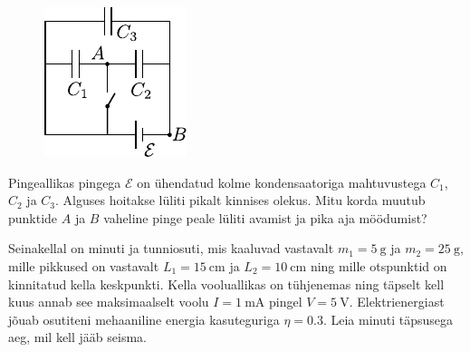 \documentclass[10pt]{article}
\begin{document}

\begin{figure}
		\vspace{-5pt}
		\includegraphics[width=\linewidth]{2020-lahg-06-yl.pdf}
	\end{figure}
	Pingeallikas pingega $\mathcal E$ on ühendatud kolme kondensaatoriga mahtuvustega $C_1$, $C_2$ ja $C_3$. Alguses hoitakse lüliti pikalt kinnises olekus. Mitu korda muutub punktide $A$ ja $B$ vaheline pinge peale lüliti avamist ja pika aja möödumist?
\probend
\bigskip

\setAuthor{}

Seinakellal on minuti ja tunniosuti, mis kaaluvad vastavalt
$m_1=\SI{5}{\gram}$ ja $m_2=\SI{25}{\gram}$, mille pikkused on vastavalt
$L_1=\SI{15}{\centi\meter}$ ja $L_2=\SI{10}{\centi\meter}$ ning mille otspunktid
on kinnitatud kella keskpunkti. Kella vooluallikas on tühjenemas ning täpselt kell kuus annab see maksimaalselt voolu $I=\SI{1}{\milli\ampere}$ pingel
$V=\SI{5}{\volt}$. Elektrienergiast jõuab osutiteni mehaaniline energia
kasuteguriga $\eta=0.3$. Leia minuti täpsusega aeg, mil kell jääb seisma.
\probend
\bigskip
\end{document}
